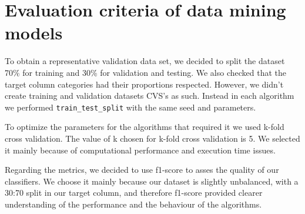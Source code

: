 
\section{Evaluation criteria of data mining models}%
\label{sec:eval-criteria}


To obtain a representative validation data set, we decided to split the dataset 70\%
for training and 30\% for validation and testing. We also checked that the target
column categories had their proportions respected. However, we didn't create training
and validation datasets CVS's as such. Instead in each algorithm we performed 
\texttt{train\_test\_split} with the same seed and parameters.

To optimize the parameters for the algorithms that required it we used k-fold cross 
validation. The value of k chosen for k-fold cross validation is 5. We selected it mainly
because of computational performance and execution time issues.

Regarding the metrics, we decided to use f1-score to asses the quality of our 
classifiers. We choose it mainly because our dataset is slightly unbalanced, with
a 30:70 split in our target column, and therefore f1-score provided 
clearer understanding of the performance and the behaviour of the algorithms.